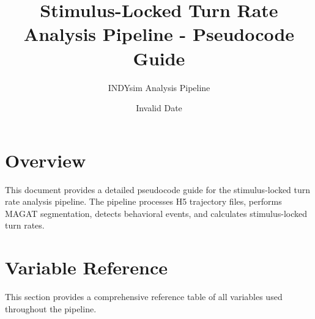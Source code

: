 \documentclass[
  11pt,
]{article}
\title{Stimulus-Locked Turn Rate Analysis Pipeline - Pseudocode Guide}
\author{INDYsim Analysis Pipeline}
\date{Invalid Date}
\renewcommand*\contentsname{Table of contents}
\newcommand\contentsname{Table of contents}
\begin{document}
\maketitle
\ifdefined\Shaded\renewenvironment{Shaded}{\begin{tcolorbox}[sharp corners, breakable, enhanced, boxrule=0pt, interior hidden, frame hidden, borderline west={3pt}{0pt}{shadecolor}]}{\end{tcolorbox}}\fi

\renewcommand*\contentsname{Table of contents}
{
\hypersetup{linkcolor=}
\setcounter{tocdepth}{3}
\tableofcontents
}
\newpage
\tableofcontents
\newpage

\hypertarget{overview}{%
\section{Overview}\label{overview}}

This document provides a detailed pseudocode guide for the
stimulus-locked turn rate analysis pipeline. The pipeline processes H5
trajectory files, performs MAGAT segmentation, detects behavioral
events, and calculates stimulus-locked turn rates.

\hypertarget{variable-reference}{%
\section{Variable Reference}\label{variable-reference}}

This section provides a comprehensive reference table of all variables
used throughout the pipeline.
\end{document}
